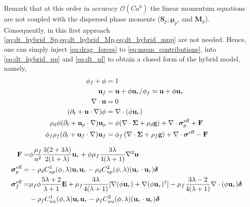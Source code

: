Remark that at this order in accuracy $\mathcal{O}(Ca^0)$ the linear momentum equations are not coupled with the dispersed phase moments ($\textbf{S}_p,\bm\mu_p$, and $\textbf{M}_p$).  
Consequently, in this first approach \ref{eq:dt_hybrid_Sp,eq:dt_hybrid_Mp,eq:dt_hybrid_mup} are not needed.
Hence, one can simply inject \ref{eq:drag_forces} to \ref{eq:mean_contributions}, into  \ref{eq:dt_hybrid_up} and \ref{eq:dt_uf} to obtain a closed form of the hybrid model, namely,  
\begin{align}
    \label{eq:first}
    \phi_f + \phi &= 1\\
    \textbf{u}_f &= \textbf{u}  + \phi \textbf{u}_r/\phi_f \approx \textbf{u} + \phi \textbf{u}_r\\
    \div \textbf{u} &= 0 \\
    (\pddt + \textbf{u} \cdot \grad)\phi
    &= \div (\phi\textbf{u}_r)\\
    \rho_d \phi (\pddt + \textbf{u}_p \cdot \grad)\textbf{u}_p
    &=
    \phi(\div \bm\Sigma
    + \rho_d  \textbf{g})
    + \div \bm\sigma_p^\text{eff}
    + \textbf{F}
    \\
    \phi_f \rho_f(\pddt + \textbf{u}_f  \cdot \grad) \textbf{u}_f
    &= \phi_f 
    \left(\div \bm{\Sigma}
    + \rho_f \textbf{g}\right)
    + \div \bm\sigma^\text{eff}
    -\textbf{F}\\
    \label{eq:last}
\end{align}

\begin{align}
    \textbf{F}=&
    \phi
    \frac{\mu_f}{a^2}
    \frac{3(2+3\lambda)}{2(1+\lambda)}\textbf{u}_r
    + \phi\mu_f  \frac{3\lambda}{4(\lambda +1)} \grad^2 \textbf{u}\\
    \bm\sigma_p^\text{eff}
    =&
    -\rho_d C^1_{up}(\phi,\lambda) \textbf{u}_r \textbf{u}_r
    -\rho_d C^2_{up}(\phi,\lambda) (\textbf{u}_r \cdot \textbf{u}_r)\bm\delta\\
    \bm\sigma_f^\text{eff}
    =&
     \mu_f \phi \frac{5\lambda +2}{\lambda+1} \textbf{E}
    + \mu_f \frac{3\lambda}{4(\lambda+1)} [
    \grad(\phi \textbf{u}_r)
    + \grad(\phi \textbf{u}_r)^\dagger]
    - \mu_f \frac{3\lambda - 2}{4(\lambda+1)} \div(\phi \textbf{u}_r)  \bm\delta\nonumber\\
    &-\rho_f C^1_{uu}(\phi,\lambda)  \textbf{u}_r \textbf{u}_r
    -\rho_f C^2_{uu} (\phi,\lambda) (\textbf{u}_r \cdot \textbf{u}_r)\bm\delta
    \label{eq:sigma_feffff}
\end{align}

